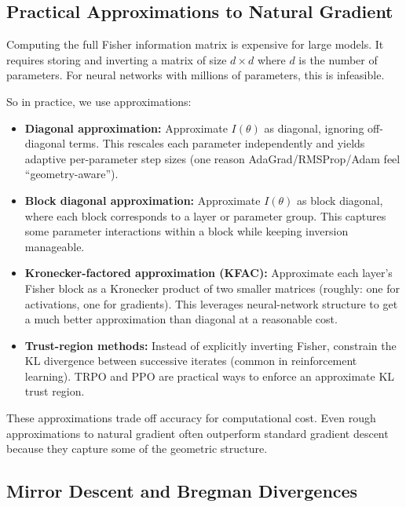 \subsection{Practical Approximations to Natural Gradient}

Computing the full Fisher information matrix is expensive for large models. It requires storing and inverting a matrix of size $d \times d$ where $d$ is the number of parameters. For neural networks with millions of parameters, this is infeasible.

So in practice, we use approximations:

\begin{itemize}
\item \textbf{Diagonal approximation:} Approximate $I(\theta)$ as diagonal, ignoring off-diagonal terms. This rescales each parameter independently and yields adaptive per-parameter step sizes (one reason AdaGrad/RMSProp/Adam feel ``geometry-aware'').

\item \textbf{Block diagonal approximation:} Approximate $I(\theta)$ as block diagonal, where each block corresponds to a layer or parameter group. This captures some parameter interactions within a block while keeping inversion manageable.

\item \textbf{Kronecker-factored approximation (KFAC):} Approximate each layer's Fisher block as a Kronecker product of two smaller matrices (roughly: one for activations, one for gradients). This leverages neural-network structure to get a much better approximation than diagonal at a reasonable cost.

\item \textbf{Trust-region methods:} Instead of explicitly inverting Fisher, constrain the KL divergence between successive iterates (common in reinforcement learning). TRPO and PPO are practical ways to enforce an approximate KL trust region.
\end{itemize}

\vspace{1em}

These approximations trade off accuracy for computational cost. Even rough approximations to natural gradient often outperform standard gradient descent because they capture some of the geometric structure.

\vspace{1.5em}

\subsection{Mirror Descent and Bregman Divergences}


